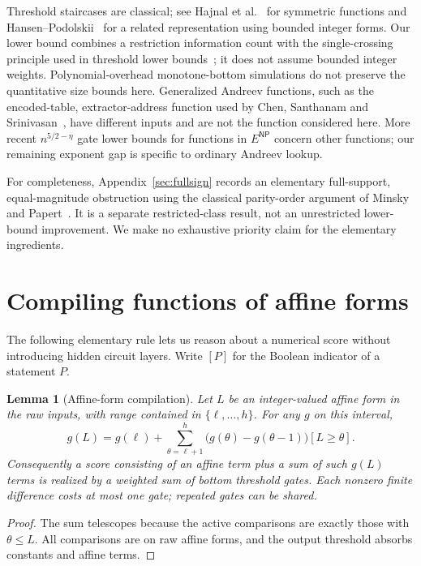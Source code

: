 \documentclass[11pt]{article}
\newtheorem{lemma}[theorem]{Lemma}
\begin{document}
Threshold staircases are classical; see Hajnal et al.~\cite[Proposition~2.1]{HMPST}
for symmetric functions and Hansen--Podolskii~\cite[Theorem~5]{HP} for a
related representation using bounded integer forms. Our lower bound
combines a restriction information count with the single-crossing
principle used in threshold lower bounds~\cite{IPS}; it does not assume
bounded integer weights. Polynomial-overhead monotone-bottom simulations
\cite[Lemma~6]{HP} do not preserve the quantitative size bounds here.
Generalized Andreev functions, such as the encoded-table, extractor-address
function used by Chen, Santhanam and Srinivasan~\cite[Section~2.4]{CSS}, have
different inputs and are not the function considered here. More recent
$n^{5/2-\eta}$ gate lower bounds for functions in $E^{\mathsf{NP}}$
\cite{CTW} concern other functions; our remaining exponent gap is specific
to ordinary Andreev lookup.

For completeness, Appendix~\ref{sec:fullsign} records an elementary
full-support, equal-magnitude obstruction using the classical parity-order
argument of Minsky and Papert~\cite[Section~3.1]{MP}. It is a separate
restricted-class result, not an unrestricted lower-bound improvement.
We make no exhaustive priority claim for the elementary ingredients.

\section{Compiling functions of affine forms}\label{sec:identities}
The following elementary rule lets us reason about a numerical score
without introducing hidden circuit layers. Write $[P]$ for the Boolean
indicator of a statement $P$.

\begin{lemma}[Affine-form compilation]\label{lem:ladder}
Let $L$ be an integer-valued affine form in the raw inputs, with range
contained in $\{\ell,\ldots,h\}$. For any $g$ on this interval,
$$
g(L)=g(\ell)+\sum_{\theta=\ell+1}^{h}
\bigl(g(\theta)-g(\theta-1)\bigr)[L\ge\theta].
$$
Consequently a score consisting of an affine term plus a sum of such
$g(L)$ terms is realized by a weighted sum of bottom threshold gates.
Each nonzero finite difference costs at most one gate; repeated gates
can be shared.
\end{lemma}
\begin{proof}
The sum telescopes because the active comparisons are exactly those
with $\theta\le L$. All comparisons are on raw affine forms, and the
output threshold absorbs constants and affine terms.
\end{proof}
\end{document}
